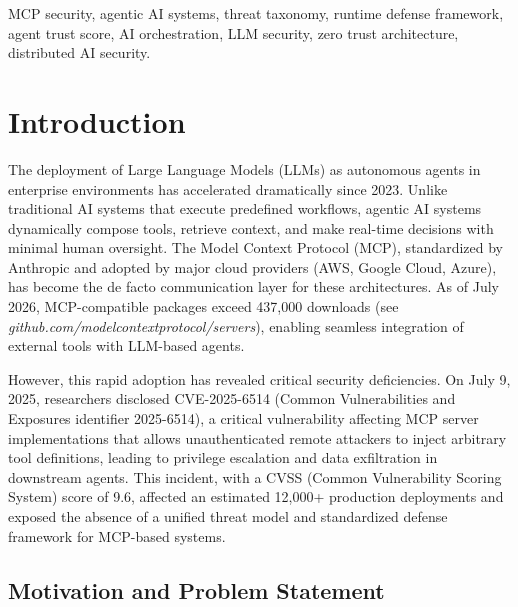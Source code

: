 \documentclass[12pt,twocolumn,journal]{IEEEtran}
\begin{document}
\begin{IEEEkeywords}
MCP security, agentic AI systems, threat taxonomy, runtime defense framework, agent trust score, AI orchestration, LLM security, zero trust architecture, distributed AI security.
\end{IEEEkeywords}

\section{Introduction}

The deployment of Large Language Models (LLMs) as autonomous agents in enterprise environments has accelerated dramatically since 2023. Unlike traditional AI systems that execute predefined workflows, agentic AI systems dynamically compose tools, retrieve context, and make real-time decisions with minimal human oversight. The Model Context Protocol (MCP), standardized by Anthropic and adopted by major cloud providers (AWS, Google Cloud, Azure), has become the de facto communication layer for these architectures. As of July 2026, MCP-compatible packages exceed 437,000 downloads (see \textit{github.com/modelcontextprotocol/servers}), enabling seamless integration of external tools with LLM-based agents.

However, this rapid adoption has revealed critical security deficiencies. On July 9, 2025, researchers disclosed CVE-2025-6514 \cite{CVE20256514} (Common Vulnerabilities and Exposures identifier 2025-6514), a critical vulnerability affecting MCP server implementations that allows unauthenticated remote attackers to inject arbitrary tool definitions, leading to privilege escalation and data exfiltration in downstream agents. This incident, with a CVSS (Common Vulnerability Scoring System) score of 9.6, affected an estimated 12,000+ production deployments and exposed the absence of a unified threat model and standardized defense framework for MCP-based systems.

\subsection{Motivation and Problem Statement}
\end{document}
